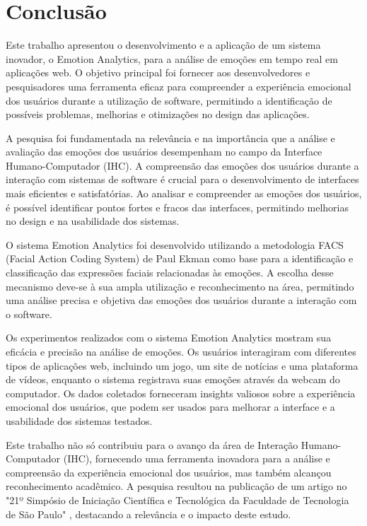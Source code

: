 \chapter{Conclusão}

Este trabalho apresentou o desenvolvimento e a aplicação de um sistema inovador, o Emotion Analytics, para a análise de emoções em tempo real em aplicações web. O objetivo principal foi fornecer aos desenvolvedores e pesquisadores uma ferramenta eficaz para compreender a experiência emocional dos usuários durante a utilização de software, permitindo a identificação de possíveis problemas, melhorias e otimizações no design das aplicações.

A pesquisa foi fundamentada na relevância e na importância que a análise e avaliação das emoções dos usuários desempenham no campo da Interface Humano-Computador (IHC). A compreensão das emoções dos usuários durante a interação com sistemas de software é crucial para o desenvolvimento de interfaces mais eficientes e satisfatórias. Ao analisar e compreender as emoções dos usuários, é possível identificar pontos fortes e fracos das interfaces, permitindo melhorias no design e na usabilidade dos sistemas.

O sistema Emotion Analytics foi desenvolvido utilizando a metodologia FACS (Facial Action Coding System) de Paul Ekman \cite{5} como base para a identificação e classificação das expressões faciais relacionadas às emoções. A escolha desse mecanismo deve-se à sua ampla utilização e reconhecimento na área, permitindo uma análise precisa e objetiva das emoções dos usuários durante a interação com o software.

Os experimentos realizados com o sistema Emotion Analytics mostram sua eficácia e precisão na análise de emoções. Os usuários interagiram com diferentes tipos de aplicações web, incluindo um jogo, um site de notícias e uma plataforma de vídeos, enquanto o sistema registrava suas emoções através da webcam do computador. Os dados coletados forneceram insights valiosos sobre a experiência emocional dos usuários, que podem ser usados para melhorar a interface e a usabilidade dos sistemas testados.

Este trabalho não só contribuiu para o avanço da área de Interação Humano-Computador (IHC), fornecendo uma ferramenta inovadora para a análise e compreensão da experiência emocional dos usuários, mas também alcançou reconhecimento acadêmico. A pesquisa resultou na publicação de um artigo no "21º Simpósio de Iniciação Científica e Tecnológica da Faculdade de Tecnologia de São Paulo" \cite{25}, destacando a relevância e o impacto deste estudo.

